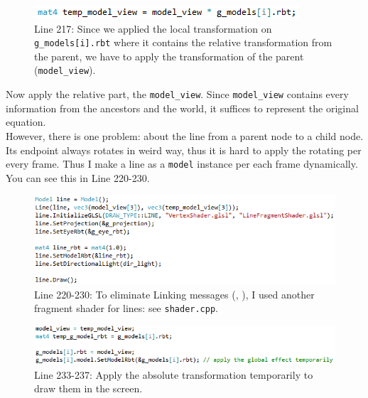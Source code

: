 \documentclass[11pt]{article}
\begin{document}
\begin{figure}[htb]
	\begin{center}
		\includegraphics[width=0.8\linewidth]{applyParentTransformation.png}
	\end{center}
	\caption{Line 217: Since we applied the local transformation on \texttt{g\_models[i].rbt} where it contains the relative transformation from the parent, we have to apply the transformation of the parent (\texttt{model\_view}).}
\end{figure}
Now apply the relative part, the \texttt{model\_view}. Since \texttt{model\_view} contains every information from the ancestors and the world, it suffices to represent the original equation. \\
However, there is one problem: about the line from a parent node to a child node. Its endpoint always rotates in weird way, thus it is hard to apply the rotating per every frame. Thus I make a line as a \texttt{model} instance per each frame dynamically. You can see this in Line 220-230.
\begin{figure}[htb]
	\begin{center}
		\includegraphics[width=1.0\linewidth]{lineGenerator.png}
	\end{center}
	\caption{Line 220-230: To eliminate Linking messages (, ), I used another fragment shader for lines: see \texttt{shader.cpp}.}
\end{figure}
\newpage
\begin{figure}[htb]
	\begin{center}
		\includegraphics[width=0.9\linewidth]{temporalAbsoluteTransformation.png}
	\end{center}
	\caption{Line 233-237: Apply the absolute transformation temporarily to draw them in the screen.}
\end{figure}
\end{document}
